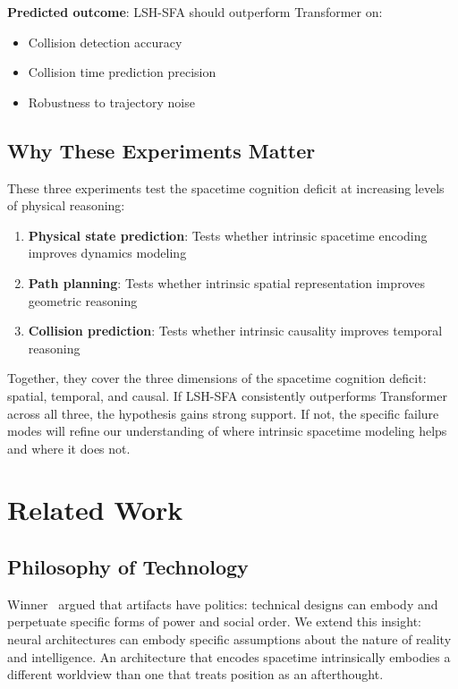 \documentclass{article}
\begin{document}
\textbf{Predicted outcome}: LSH-SFA should outperform Transformer on:
\begin{itemize}
\item Collision detection accuracy
\item Collision time prediction precision
\item Robustness to trajectory noise
\end{itemize}

\subsection{Why These Experiments Matter}

These three experiments test the spacetime cognition deficit at increasing levels of physical reasoning:

\begin{enumerate}
\item \textbf{Physical state prediction}: Tests whether intrinsic spacetime encoding improves dynamics modeling
\item \textbf{Path planning}: Tests whether intrinsic spatial representation improves geometric reasoning
\item \textbf{Collision prediction}: Tests whether intrinsic causality improves temporal reasoning
\end{enumerate}

Together, they cover the three dimensions of the spacetime cognition deficit: spatial, temporal, and causal. If LSH-SFA consistently outperforms Transformer across all three, the hypothesis gains strong support. If not, the specific failure modes will refine our understanding of where intrinsic spacetime modeling helps and where it does not.

\section{Related Work}

\subsection{Philosophy of Technology}

Winner~\citep{winner1980} argued that artifacts have politics: technical designs can embody and perpetuate specific forms of power and social order. We extend this insight: neural architectures can embody specific assumptions about the nature of reality and intelligence. An architecture that encodes spacetime intrinsically embodies a different worldview than one that treats position as an afterthought.
\end{document}
